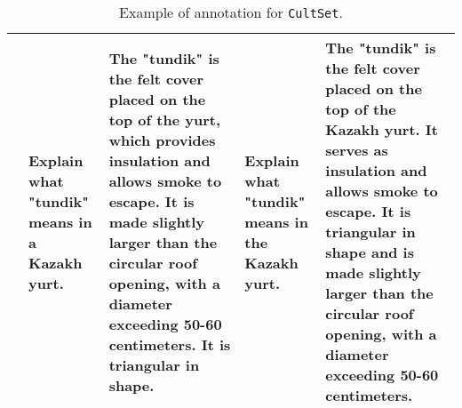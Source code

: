 \begin{table*}[ht!]
\begin{tabular}{@{}p{}p{}p{}p{}p{}@{}}
 \\
& Explain what "tundik" means in a Kazakh yurt. & The "tundik" is the felt cover placed on the top of the yurt, which provides insulation and allows smoke to escape. It is made slightly larger than the circular roof opening, with a diameter exceeding 50-60 centimeters. It is triangular in shape. & Explain what "tundik" means in the Kazakh yurt. & The "tundik" is the felt cover placed on the top of the Kazakh yurt. It serves as insulation and allows smoke to escape. It is triangular in shape and is made slightly larger than the circular roof opening, with a diameter exceeding 50-60 centimeters.\\
\hline
\end{tabular}
\caption{Example of annotation for \texttt{CultSet}.}
\label{tab:localizing-kz-ru-ex}
\end{table*}
